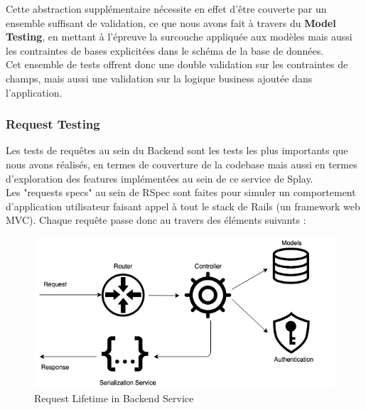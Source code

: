 \documentclass{eplmastersthesis}
\begin{document}
          Cette abstraction supplémentaire nécessite en effet d'être couverte par
          un ensemble suffisant de validation, ce que nous avons fait à travers
          du \textbf{Model Testing}, en mettant à l'épreuve la surcouche appliquée
          aux modèles mais aussi les contraintes de bases explicitées dans le
          schéma de la base de données.\\

          Cet ensemble de tests offrent donc une double validation sur les contraintes
          de champs, mais aussi une validation sur la logique business ajoutée
          dans l'application.

        \subsubsection{Request Testing}

          Les tests de requêtes au sein du Backend sont les tests les plus
          importants que nous avons réalisés, en termes de couverture de la
          codebase mais aussi en termes d'exploration des features implémentées
          au sein de ce service de Splay.\\

          Les "requests specs" au sein de RSpec sont faites pour simuler un
          comportement d'application utilisateur faisant appel à tout le stack
          de Rails (un framework web MVC).
          Chaque requête passe donc au travers des éléments suivants :\\

          \begin{figure}[H]
            \centering
            \includegraphics[scale=0.6]{figures/request_test.png}
            \caption{\label{new_arch} Request Lifetime in Backend Service}
          \end{figure}
\end{document}
